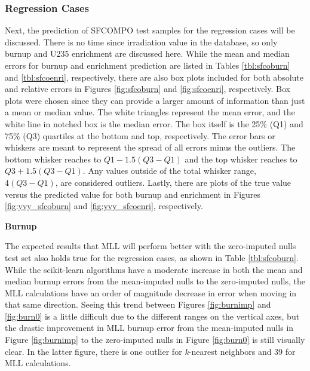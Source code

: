 \subsubsection{Regression Cases}
\label{sec:sfcoreg}

Next, the prediction of \gls{SFCOMPO} test samples for the regression cases
will be discussed. There is no time since irradiation value in the database, so
only burnup and \gls{U235} enrichment are discussed here.  While the mean and
median errors for burnup and enrichment prediction are listed in Tables
\ref{tbl:sfcoburn} and \ref{tbl:sfcoenri}, respectively, there are also box
plots included for both absolute and relative errors in Figures
\ref{fig:sfcoburn} and \ref{fig:sfcoenri}, respectively.  Box plots were chosen
since they can provide a larger amount of information than just a mean or
median value.  The white triangles represent the mean error, and the white line
in notched box is the median error. The box itself is the 25\% (Q1) and 75\%
(Q3) quartiles at the bottom and top, respectively. The error bars or whiskers
are meant to represent the spread of all errors minus the outliers.  The bottom
whisker reaches to $Q1 - 1.5(Q3-Q1)$ and the top whisker reaches to $Q3 +
1.5(Q3-Q1)$. Any values outside of the total whisker range, $4(Q3-Q1)$, are
considered outliers. \cite{matplotlib} Lastly, there are plots of the true
value versus the predicted value for both burnup and enrichment in Figures
\ref{fig:yvy_sfcoburn} and \ref{fig:yvy_sfcoenri}, respectively.

\noindent \textbf{Burnup}

The expected results that \gls{MLL} will perform better with the zero-imputed
nulls test set also holds true for the regression cases, as shown in Table
\ref{tbl:sfcoburn}.  While the scikit-learn algorithms have a moderate increase
in both the mean and median burnup errors from the mean-imputed nulls to the
zero-imputed nulls, the \gls{MLL} calculations have an order of magnitude
decrease in error when moving in that same direction.  Seeing this trend
between Figures \ref{fig:burnimp} and \ref{fig:burn0} is a little difficult due
to the different ranges on the vertical axes, but the drastic improvement in
\gls{MLL} burnup error from the mean-imputed nulls in Figure \ref{fig:burnimp}
to the zero-imputed nulls in Figure \ref{fig:burn0} is still visually clear. In
the latter figure, there is one outlier for \textit{k}-nearest neighbors and 39
for \gls{MLL} calculations.


